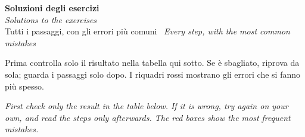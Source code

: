 \documentclass[11pt,a4paper]{article}
\newcommand{\en}[1]{\par{\small\itshape\color{engray}#1\par}}
\begin{document}
\begin{center}
{\LARGE\bfseries\color{navy} Soluzioni degli esercizi}\\[3pt]
{\large\itshape\color{engray} Solutions to the exercises}\\[6pt]
{\normalsize Tutti i passaggi, con gli errori più comuni \textperiodcentered\ \textit{\color{engray}Every step, with the most common mistakes}}
\end{center}

\begin{tcolorbox}[colback=navy!4, colframe=navy!50, boxrule=0.5pt, arc=2pt, left=6pt, right=6pt, top=4pt, bottom=4pt,
  title={Come usare le soluzioni \textperiodcentered\ \itshape How to use the solutions}, fonttitle=\bfseries\small, colbacktitle=navy!70]
Prima controlla solo il risultato nella tabella qui sotto. Se è sbagliato, riprova da sola; guarda i passaggi solo dopo.
I riquadri rossi mostrano gli errori che si fanno più spesso.
\en{First check only the result in the table below. If it is wrong, try again on your own, and read the steps only afterwards. The red boxes show the most frequent mistakes.}
\end{tcolorbox}
\end{document}
